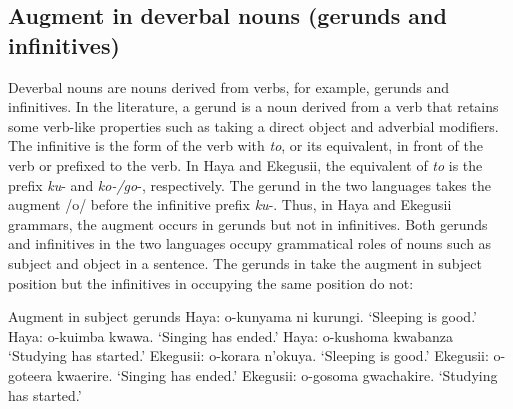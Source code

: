 \documentclass[output=paper]{langscibook}
\begin{document}
\subsection{Augment in deverbal nouns (gerunds and infinitives)}
	Deverbal nouns are nouns derived from verbs, for example, gerunds and infinitives. In the literature, a gerund is a noun derived from a verb that retains some verb-like properties such as taking a direct object and adverbial modifiers. The infinitive is the form of the verb with \textit{to}, or its equivalent, in front of the verb or prefixed to the verb. In Haya and Ekegusii, the equivalent of \textit{to} is the prefix \textit{ku}- and \textit{ko-/go}-, respectively. The gerund in the two languages takes the augment /o/ before the infinitive prefix \textit{ku}-. Thus, in Haya and Ekegusii grammars, the augment occurs in gerunds but not in infinitives. Both gerunds and infinitives in the two languages occupy grammatical roles of nouns such as subject and object in a sentence. The gerunds in  take the augment in subject position but the infinitives in  occupying the same position do not:

\ea Augment in subject gerunds\smallskip
\label{hayagusii17}
  \ea\label{hayagusii17a} 	Haya:\hphantom{isit} 		o-kunyama ni kurungi. 	‘Sleeping is good.’
  \ex\label{hayagusii17b} 	Haya:\hphantom{isit} 		o-kuimba kwawa.\hphantom{rungi}		‘Singing has ended.’
  \ex\label{hayagusii17c} 	Haya:\hphantom{isit} 		o-kushoma kwabanza\hphantom{ii}		‘Studying has started.’
  \ex\label{hayagusii17d} 	Ekegusii:  	o-korara n’okuya.\hphantom{iungi}		‘Sleeping is good.’
  \ex\label{hayagusii17e} 	Ekegusii: 	o-goteera kwaerire.\hphantom{ngt}		‘Singing has ended.’
  \ex\label{hayagusii17f} 	Ekegusii: 	o-gosoma gwachakire.\hphantom{i} 	‘Studying has started.’
  \z
\z
\end{document}
